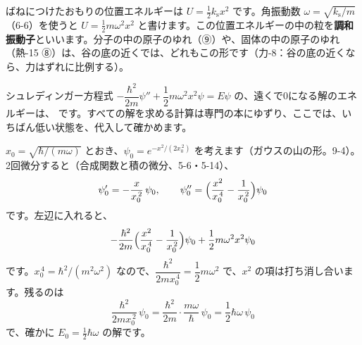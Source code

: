 \label{ph:原-6:sec8}
ばねにつけたおもりの位置エネルギーは $U=\tfrac12k_{\mathrm s}x^2$ です。角振動数 $\omega=\sqrt{k_{\mathrm s}/m}$（6-6）を使うと $U=\tfrac12m\omega^2x^2$ と書けます。この位置エネルギーの中の粒を\textbf{調和振動子}といいます。分子の中の原子のゆれ（⑨）や、固体の中の原子のゆれ（熱-15 ⑧）は、谷の底の近くでは、どれもこの形です（力-8：谷の底の近くなら、力はずれに比例する）。

シュレディンガー方程式 $-\dfrac{\hbar^2}{2m}\psi''+\dfrac12m\omega^2x^2\psi=E\psi$ の、遠くで0になる解のエネルギーは、
\label{ph:原-6:chowa}です。すべての解を求める計算は専門の本にゆずり、ここでは、いちばん低い状態を、代入して確かめます。

$x_0=\sqrt{\hbar/(m\omega)}$ とおき、$\psi_0=e^{-x^2/(2x_0^{\,2})}$ を考えます（ガウスの山の形。9-4）。2回微分すると（合成関数と積の微分、5-6・5-14）、
\[\psi_0'=-\frac{x}{x_0^{\,2}}\,\psi_0,\qquad \psi_0''=\Bigl(\frac{x^2}{x_0^{\,4}}-\frac{1}{x_0^{\,2}}\Bigr)\psi_0\]
です。左辺に入れると、
\[-\frac{\hbar^2}{2m}\Bigl(\frac{x^2}{x_0^{\,4}}-\frac{1}{x_0^{\,2}}\Bigr)\psi_0+\frac12m\omega^2x^2\psi_0\]
です。$x_0^{\,4}=\hbar^2/(m^2\omega^2)$ なので、$\dfrac{\hbar^2}{2mx_0^{\,4}}=\dfrac12m\omega^2$ で、$x^2$ の項は打ち消し合います。残るのは
\[\frac{\hbar^2}{2mx_0^{\,2}}\,\psi_0=\frac{\hbar^2}{2m}\cdot\frac{m\omega}{\hbar}\,\psi_0=\frac12\hbar\omega\,\psi_0\]
で、確かに $E_0=\tfrac12\hbar\omega$ の解です。

\begin{phflow}
\end{phflow}

